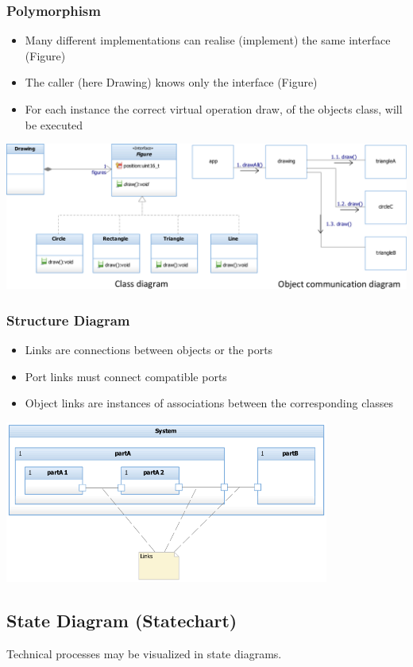 \subsubsection{Polymorphism}
\begin{itemize}
    \item Many different implementations can realise (implement) the same interface (Figure)
    \item The caller (here Drawing) knows only the interface (Figure)
    \item For each instance the correct virtual operation draw, of the objects class, will be executed
\end{itemize}
\includegraphics[width=1\textwidth]{images/UML/polymorphism.png}

\subsubsection{Structure Diagram}
\begin{itemize}
    \item Links are connections between objects or the ports
    \item Port links must connect compatible ports
    \item Object links are instances of associations between the corresponding classes
\end{itemize}
\includegraphics[width=0.8\textwidth]{images/UML/structure_diagram.png}


\subsection{State Diagram (Statechart)}
Technical processes may be visualized in state diagrams.

